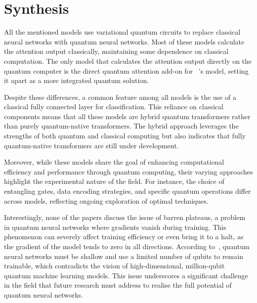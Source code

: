 \section{Synthesis}
\label{sec:synthesis}
All the mentioned models use variational quantum circuits to
replace classical neural networks with quantum neural networks. Most
of these models calculate the attention output classically,
maintaining some dependence on classical computation. The only model
that calculates the attention output directly on the quantum computer
is the direct quantum attention add-on for ~\citet{Cherrat_2024}’s
model, setting it apart as a more integrated quantum solution.

Despite these differences, a common feature among all models is the
use of a classical fully connected layer for classification. This
reliance on classical components means that all these models are
hybrid quantum transformers rather than purely quantum-native
transformers. The hybrid approach leverages the strengths of both
quantum and classical computing but also indicates that fully
quantum-native transformers are still under development.

Moreover, while these models share the goal of enhancing
computational efficiency and performance through quantum computing,
their varying approaches highlight the experimental nature of the
field. For instance, the choice of entangling gates, data encoding
strategies, and specific quantum operations differ across models,
reflecting ongoing exploration of optimal techniques.

Interestingly, none of the papers discuss the issue of barren
plateaus, a problem in quantum neural networks where gradients vanish
during training. This phenomenon can severely affect training
efficiency or even bring it to a halt, as the gradient of the model
tends to zero in all directions. According to~\citet{McClean_2018},
quantum neural networks must be shallow and use a limited number of
qubits to remain trainable, which contradicts the vision of
high-dimensional, million-qubit quantum machine learning models. This
issue underscores a significant challenge in the field that future
research must address to realise the full potential of quantum neural networks.

